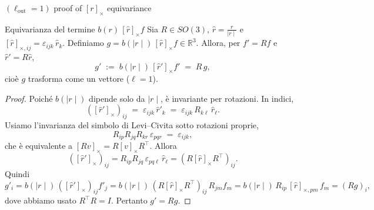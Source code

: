 \documentclass[aspectratio=32,8pt]{beamer}
\begin{document}
\begin{frame}{ \((\ell_\text{out}=1) \) proof of \([r]_\times \) equivariance}
\tiny
\vspace{-10pt}
    \begin{lemma}{Equivarianza del termine \(b(r)\,[\hat r]_\times f \)}
Sia  \(R\in SO(3) \),  \(\hat r=\tfrac{r}{\mid r \mid} \) e \([\hat r]_{\times,ij}=\varepsilon_{ijk}\,\hat r_k \).
Definiamo  \(g=b(\mid r \mid)\,[\hat r]_\times f\in\mathbb R^3 \). Allora, per  \(f' = R f \) e  \(\hat r' = R \hat r \),
\[
g' \;:=\; b(\mid r \mid)\,[\hat r']_\times f' \;=\; R\,g,
\]
cio\`e \(g \) trasforma come un vettore (\(\ell=1 \)).
\end{lemma}
\vspace{-10pt}
\begin{proof}
Poich\'e  \(b(\mid r\mid ) \) dipende solo da  \(\mid r\mid \), \`e invariante per rotazioni. In indici,
\[
([\hat r']_\times)_{ij} \;=\; \varepsilon_{ijk}\,\hat r'_k
\;=\; \varepsilon_{ijk}\,R_{k\ell}\,\hat r_\ell.
\]
Usiamo l'invarianza del simbolo di Levi--Civita sotto rotazioni proprie,
\[
R_{ip}R_{jq}R_{kr}\,\varepsilon_{pqr} \;=\; \varepsilon_{ijk},
\]
che \`e equivalente a  \([R v]_\times = R [v]_\times R^\top \). Allora
\[
([\hat r']_\times)_{ij}
= R_{ip}R_{jq}\,\varepsilon_{pq\ell}\,\hat r_\ell
= (R[\hat r]_\times R^\top)_{ij}.
\]
Quindi
\[
g'_i = b(\mid r \mid)\,([\hat r']_\times)_{ij} f'_j
= b(\mid r \mid)\,(R[\hat r]_\times R^\top)_{ij}\,R_{jm} f_m
= b(\mid r \mid)\,R_{ip}\,[\hat r]_{\times,pm}\,f_m
= (R g)_i,
\]
dove abbiamo usato \(R^\top R = I\). Pertanto \(g' = R g\).
\end{proof}

\end{frame}
\end{document}
